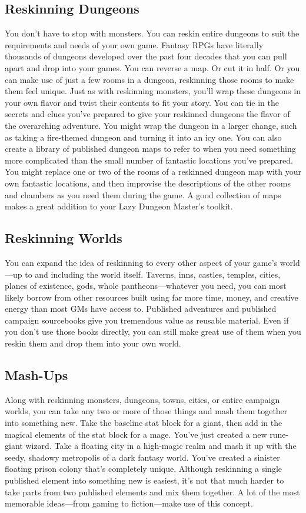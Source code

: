 \documentclass[10pt,a4paper,twoside,bg=print,twocolumn,openany,nodeprecatedcode]{dndbook}
\begin{document}
\subsection{Reskinning Dungeons}
You don't have to stop with monsters. You can reskin entire dungeons to suit the requirements and needs of your own game. Fantasy RPGs have literally thousands of dungeons developed over the past four decades that you can pull apart and drop into your games. You can reverse a map. Or cut it in half. Or you can make use of just a few rooms in a dungeon, reskinning those rooms to make them feel unique.
Just as with reskinning monsters, you'll wrap these dungeons in your own flavor and twist their contents to fit your story. You can tie in the secrets and clues you've prepared to give your reskinned dungeons the flavor of the overarching adventure. You might wrap the dungeon in a larger change, such as taking a fire-themed dungeon and turning it into an icy one.
You can also create a library of published dungeon maps to refer to when you need something more complicated than the small number of fantastic locations you've prepared. You might replace one or two of the rooms of a reskinned dungeon map with your own fantastic locations, and then improvise the descriptions of the other rooms and chambers as you need them during the game. A good collection of maps makes a great addition to your Lazy Dungeon Master's toolkit.
\subsection{Reskinning Worlds}
You can expand the idea of reskinning to every other aspect of your game's world—up to and including the world itself. Taverns, inns, castles, temples, cities, planes of existence, gods, whole pantheons—whatever you need, you can most likely borrow from other resources built using far more time, money, and creative energy than most GMs have access to. Published adventures and published campaign sourcebooks give you tremendous value as reusable material. Even if you don't use those books directly, you can still make great use of them when you reskin them and drop them into your own world.
\subsection{Mash-Ups}
Along with reskinning monsters, dungeons, towns, cities, or entire campaign worlds, you can take any two or more of those things and mash them together into something new. Take the baseline stat block for a giant, then add in the magical elements of the stat block for a mage. You've just created a new rune-giant wizard. Take a floating city in a high-magic realm and mash it up with the seedy, shadowy metropolis of a dark fantasy world. You've created a sinister floating prison colony that's completely unique. Although reskinning a single published element into something new is easiest, it's not that much harder to take parts from two published elements and mix them together. A lot of the most memorable ideas—from gaming to fiction—make use of this concept.
\end{document}
